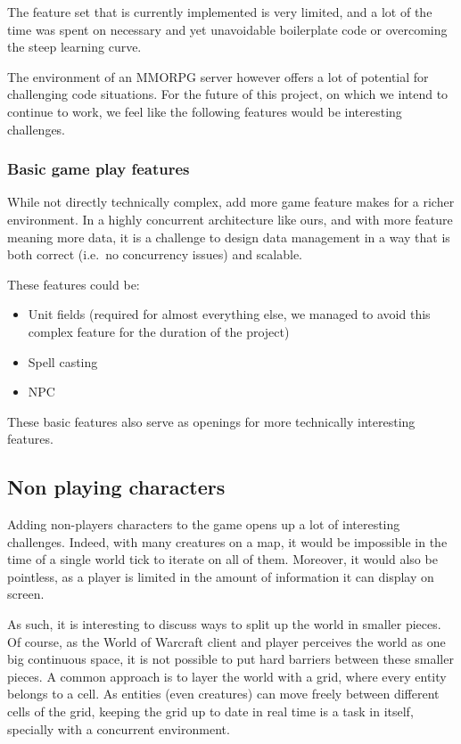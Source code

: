 \documentclass[paper=a4, fontsize=11pt]{scrartcl}
\begin{document}
The feature set that is currently implemented is very limited, and a lot of the
time was spent on necessary and yet unavoidable boilerplate code or overcoming
the steep learning curve.

The environment of an MMORPG server however offers a lot of potential for
challenging code situations.
For the future of this project, on which we intend to continue to work, we
feel like the following features would be interesting challenges.

\subsubsection{Basic game play features}

While not directly technically complex, add more game feature makes for a
richer environment. In a highly concurrent architecture like ours, and with more
feature meaning more data, it is a challenge to design data management in a way
that is both correct (i.e.\ no concurrency issues) and scalable.

These features could be:
\begin{itemize}
    \item Unit fields (required for almost everything else, we managed to avoid
        this complex feature for the duration of the project)
    \item Spell casting
    \item \gls{NPC}
\end{itemize}

These basic features also serve as openings for more technically interesting
features.

\subsection{Non playing characters}

Adding non-players characters to the game opens up a lot of interesting
challenges.
Indeed, with many creatures on a map, it would be impossible in the time of a
single world tick to iterate on all of them.
Moreover, it would also be pointless, as a player is limited in the amount of
information it can display on screen.

As such, it is interesting to discuss ways to split up the world in smaller
pieces.
Of course, as the World of Warcraft client and player perceives the world
as one big continuous space, it is not possible to put hard barriers between
these smaller pieces.
A common approach is to layer the world with a grid, where every entity belongs
to a cell. As entities (even creatures) can move freely between different cells 
of the grid, keeping the grid up to date in real time is a task in itself,
specially with a concurrent environment.
\end{document}
